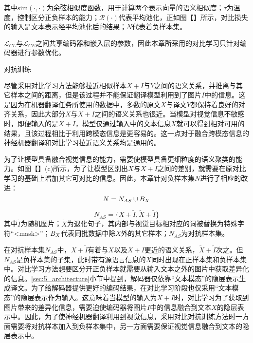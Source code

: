 其中$\mathrm{sim}(\cdot,\cdot)$为余弦相似度函数，用于计算两个表示向量的语义相似度；$\tau$为温度，控制区分正负样本的能力；$\mathcal{R}(\cdot)$代表平均池化，正如图【】所示，对比损失的输入是文本表示经平均池化后的结果；$N$代表着负样本集。

$\mathcal{L}_{CL}$与$\mathcal{L}_{CE}$之间共享编码器和嵌入层的参数，因此本章所采用的对比学习只针对编码器进行参数优化。

{\sffamily 对抗训练}

尽管采用对比学习方法能够拉近相似样本$X+I$与$Y$之间的语义关系，并推离与其它样本之间的距离，但是该过程并不能保证翻译模型利用到了图片$I$中的信息。这是因为在机器翻译任务所使用的数据中，多数的原文$X$与译文$Y$都保持着良好的对齐关系，因此大部分$X$与$X+I$之间的语义关系也很近。当模型对视觉信息不敏感时，即便输入的是$X+I$，模型仅通过输入中的文本信息$X$就可以得到相对可用的结果，且该过程相比于利用跨模态信息是更容易的。这一点对于融合跨模态信息的神经机器翻译和对比学习拉近语义关系均是通用的。

为了让模型具备融合视觉信息的能力，需要使模型具备更细粒度的语义聚类的能力。如图【】(c)所示，为了让模型区别出$X$与$X+I$之间的差别，就需要在原对比学习的基础上增加其它可对比的信息。因此，本章针对负样本集$N$进行了相应的改进：
\begin{equation}
    N=N_{AS}\cup B_{\\X}
    \label{eq:5_negative_sample_set}
\end{equation}

\begin{equation}
    N_{AS}=\{X+\tilde{I},\tilde{X}+\tilde{I}\}
    \label{eq:5_adversarial_sample_set}
\end{equation}
其中$\tilde{I}$为随机图片；$\tilde{X}$为退化句子，其内部与视觉目标相对应的词被替换为特殊字符“<mask>”；$B_{\\X}$代表同批数据中除$X$外的其它样本；$N_{AS}$为对抗样本集。

在对抗样本集$N_{AS}$中，$X+\tilde{I}$有着与$X$以及$X+I$更近的语义关系，$\tilde{X}+\tilde{I}$次之。但$N_{AS}$是负样本集的子集，此时带有源语言信息的$X$同时出现在正样本集和负样本集中。对比学习方法想要区分开正负样本就需要从输入文本之外的图片中获取差异化的信息。\ref{sec:5_architecture}小节中提到，解码器仅依靠“文本模态”的隐层表示生成译文。为了给解码器提供更好的编码结果，在对比学习阶段也仅采用“文本模态”的隐层表示作为输入。这意味着当模型的输入为$X+I$时，对比学习为了获取到图片带来的差异化信息，需要迫使编码器将图片$I$中的信息融合到文本$X$的隐层表示中。因此，为了使神经机器翻译利用到视觉信息，采用对比对抗训练方法时一方面需要将对抗样本加入到负样本集中，另一方面需要保证视觉信息融合到文本的隐层表示中。

